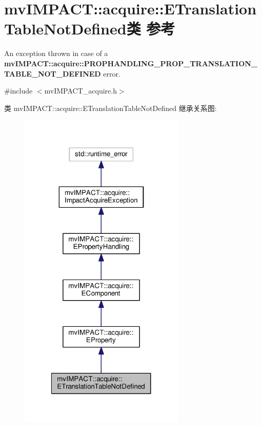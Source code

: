 \hypertarget{classmv_i_m_p_a_c_t_1_1acquire_1_1_e_translation_table_not_defined}{\section{mv\+I\+M\+P\+A\+C\+T\+:\+:acquire\+:\+:E\+Translation\+Table\+Not\+Defined类 参考}
\label{classmv_i_m_p_a_c_t_1_1acquire_1_1_e_translation_table_not_defined}
}


An exception thrown in case of a {\bfseries mv\+I\+M\+P\+A\+C\+T\+::acquire\+::\+P\+R\+O\+P\+H\+A\+N\+D\+L\+I\+N\+G\+\_\+\+P\+R\+O\+P\+\_\+\+T\+R\+A\+N\+S\+L\+A\+T\+I\+O\+N\+\_\+\+T\+A\+B\+L\+E\+\_\+\+N\+O\+T\+\_\+\+D\+E\+F\+I\+N\+E\+D} error.  




{\ttfamily \#include $<$mv\+I\+M\+P\+A\+C\+T\+\_\+acquire.\+h$>$}



类 mv\+I\+M\+P\+A\+C\+T\+:\+:acquire\+:\+:E\+Translation\+Table\+Not\+Defined 继承关系图\+:
\nopagebreak
\begin{figure}[H]
\begin{center}
\leavevmode
\includegraphics[width=224pt]{classmv_i_m_p_a_c_t_1_1acquire_1_1_e_translation_table_not_defined__inherit__graph}
\end{center}
\end{figure}


